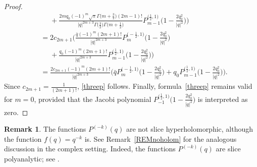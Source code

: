 \documentclass[reqno,11pt]{amsart}
\theoremstyle{definition}
\newtheorem{remark}[theorem]{Remark}
\begin{document}
\begin{proof}
\begin{align*}
		&\phantom{=} +\frac{2mq_0 (-1)^m\sqrt{\pi}\Gamma\big(m+\frac{3}{2}\big)(2m-1)!}{|q|^{2m+3}\Gamma\big(\frac{3}{2}\big)\Gamma\big(m+\frac{1}{2}\big)} P_{m-1}^{\big(\frac{1}{2},1\big)}\bigg(1-\frac{2q_0^2}{|q|^2}\bigg) \bigg)\\
		&= 2 c_{2m+1}\bigg(\frac{\bar{q}(-1)^m(2m+1)!}{|q|^{2m+3}}P_{m}^{\big(-\frac{1}{2},1\big)}\bigg(1-\frac{2q_0^2}{|q|^2}\bigg) \\
		&\phantom{=} +\frac{q_0 (-1)^m(2m+1)!}{|q|^{2m+3}} P_{m-1}^{\big(\frac{1}{2},1\big)}\bigg(1-\frac{2q_0^2}{|q|^2}\bigg) \bigg)\\
		&=\frac{2 c_{2m+1}(-1)^m (2m+1)!}{|q|^{2m+3}}\bigg(\bar{q}P_{m}^{\big(-\frac{1}{2},1\big)}\bigg(1-\frac{2q_0^2}{|q|^2}\bigg)+q_0P_{m-1}^{\big(\frac{1}{2},1\big)}\bigg(1-\frac{2q_0^2}{|q|^2}\bigg)\bigg).
	\end{align*}
Since $c_{2m+1}=\frac{1}{(2m+1)!}$, \eqref{threep} follows. Finally, formula~\eqref{threep} remains valid for $ m = 0$, provided that the Jacobi polynomial $ P_{-1}^{\big(\frac{1}{2},1\big)}\Big(1 - \frac{2q_0^2}{|q|^2}\Big)$
is interpreted as zero.
\end{proof}
\begin{remark}\label{REMnoslice}
The functions $P^{(-k)}(q)$ are not slice hyperholomorphic, although the function $f(q)=q^{-k}$ is. See Remark~\ref{REMnoholom} for the analogous discussion in the complex setting. Indeed, the functions $P^{(-k)}(q)$ are slice polyanalytic; see \cite{ADS}.
\end{remark}
\end{document}
